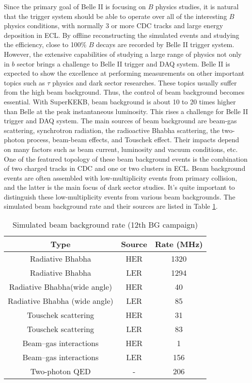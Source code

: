 Since the primary goal of Belle II is focusing on $B$ physics studies, it is natural that the trigger system should be able to operate over all of the interesting $B$ physics conditions, with normally 3 or more CDC tracks and large energy deposition in ECL. By offline reconstructing the simulated events and studying the efficiency, close to 100\% $B$ decays are recorded by Belle II trigger system. However, the extensive capabilities of studying a large range of physics not only in $b$ sector brings a challenge to Belle II trigger and DAQ system. Belle II is expected to show the excellence at performing measurements on other important topics such as $\tau$ physics and dark sector researches. These topics usually suffer from the high beam background. Thus, the control of beam background becomes essential.
With SuperKEKB, beam background is about 10 to 20 times higher than Belle at the peak instantaneous luminosity. This rises a challenge for Belle II trigger and DAQ system. The main sources of beam background are beam-gas scattering, synchrotron radiation, the radioactive Bhabha scattering, the two-photon process, beam-beam effects, and Touschek effect. Their impacts depend on many factors such as beam current, luminosity and vacuum conditions, etc. One of the featured topology of these beam background events is the combination of two charged tracks in CDC and one or two clusters in ECL. Beam background events are often assembled with low-multiplicity events from primary collision, and the latter is the main focus of dark sector studies. It's quite important to distinguish these low-multiplicity events from various beam backgrounds. The simulated beam background rate and their sources are listed in Table \ref{tab:BG}.

\begin{table}[htbp]
	\centering
	\large
	\caption{Simulated beam background rate (12th BG campaign)\cite{b2book}}
	\label{tab:BG}
	\begin{tabular}{c c c}
		\toprule
		Type & Source & Rate (MHz)\\
		\hline
		Radiative Bhabha & HER &  1320\\
		Radiative Bhabha & LER &  1294\\
		Radiative Bhabha(wide angle) & HER &  40\\
		Radiative Bhabha (wide angle) & LER &  85\\
		Touschek scattering & HER &  31\\
		Touschek scattering & LER &  83\\
		Beam–gas interactions & HER &  1\\
		Beam–gas interactions & LER &  156\\
		Two-photon QED & - & 206\\
		\bottomrule
	\end{tabular}
\end{table}

